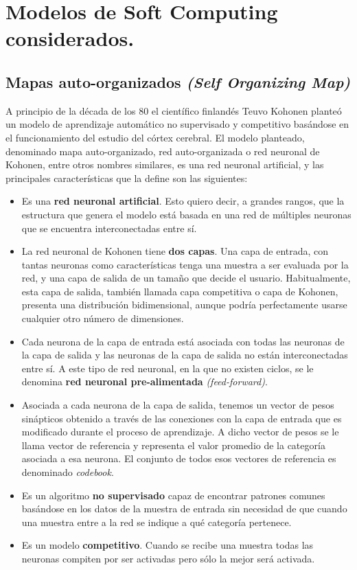 ﻿%
\chapter{Modelos de Soft Computing considerados.}
\section{Mapas auto-organizados \textit{(Self Organizing Map)}}
A principio de la década de los 80 el científico finlandés Teuvo Kohonen \cite{kohonensom} planteó un modelo de aprendizaje automático no supervisado y competitivo basándose en el funcionamiento del estudio del córtex cerebral. El modelo planteado, denominado mapa auto-organizado, red auto-organizada o red neuronal de Kohonen, entre otros nombres similares, es una red neuronal artificial, y las principales características que la define son las siguientes:

\begin{itemize}
	\item Es una \textbf{red neuronal artificial}. Esto quiero decir, a grandes rangos, que la estructura que genera el modelo está basada en una red de múltiples neuronas que se encuentra interconectadas entre sí.
	
	\item La red neuronal de Kohonen tiene \textbf{dos capas}. Una capa de entrada, con tantas neuronas como características tenga una muestra a ser evaluada por la red, y una capa de salida de un tamaño que decide el usuario. Habitualmente, esta capa de salida, también llamada capa competitiva o capa de Kohonen, presenta una distribución bidimensional, aunque podría perfectamente usarse cualquier otro número de dimensiones.

	\item Cada neurona de la capa de entrada está asociada con todas las neuronas de la capa de salida y las neuronas de la capa de salida no están interconectadas entre sí. A este tipo de red neuronal, en la que no existen ciclos, se le denomina \textbf{red neuronal pre-alimentada} \textit{(feed-forward)}.

	\item Asociada a cada neurona de la capa de salida, tenemos un vector de pesos sinápticos obtenido a través de las conexiones con la capa de entrada que es modificado durante el proceso de aprendizaje. A dicho vector de pesos se le llama vector de referencia y representa el valor promedio de la categoría asociada a esa neurona. El conjunto de todos esos vectores de referencia es denominado \textit{codebook}.

	\item Es un algoritmo \textbf{no supervisado} capaz de encontrar patrones comunes basándose en los datos de la muestra de entrada sin necesidad de que cuando una muestra entre a la red se indique a qué categoría pertenece.

	\item Es un modelo \textbf{competitivo}. Cuando se recibe una muestra todas las neuronas compiten por ser activadas pero sólo la mejor será activada.
\end{itemize}

